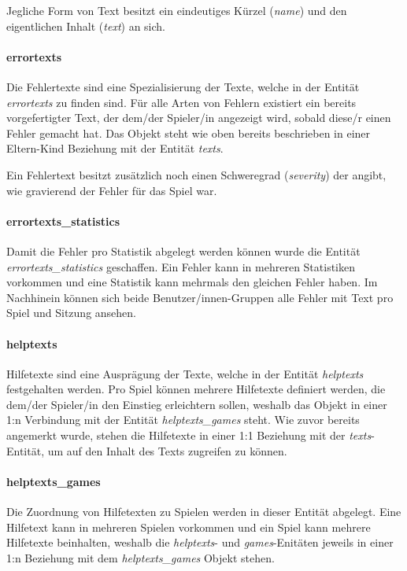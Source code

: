 Jegliche Form von Text besitzt ein eindeutiges Kürzel (\textit{name}) und den eigentlichen Inhalt (\textit{text}) an sich. 
    
\paragraph{errortexts}
Die Fehlertexte sind eine Spezialisierung der Texte, welche in der Entität \textit{errortexts} zu finden sind. Für alle Arten von Fehlern existiert ein bereits vorgefertigter Text, der dem/der Spieler/in angezeigt wird, sobald diese/r einen Fehler gemacht hat. Das Objekt steht wie oben bereits beschrieben in einer Eltern-Kind Beziehung mit der Entität \textit{texts}.

Ein Fehlertext besitzt zusätzlich noch einen Schweregrad (\textit{severity}) der angibt, wie gravierend der Fehler für das Spiel war.
    
\paragraph{errortexts\_statistics}
Damit die Fehler pro Statistik abgelegt werden können wurde die Entität \textit{errortexts\_statistics} geschaffen. Ein Fehler kann in mehreren Statistiken vorkommen und eine Statistik kann mehrmals den gleichen Fehler haben. Im Nachhinein können sich beide Benutzer/innen-Gruppen alle Fehler mit Text pro Spiel und Sitzung ansehen.
    
\paragraph{helptexts}
Hilfetexte sind eine Ausprägung der Texte, welche in der Entität \textit{helptexts} festgehalten werden. Pro Spiel können mehrere Hilfetexte definiert werden, die dem/der Spieler/in den Einstieg erleichtern sollen, weshalb das Objekt in einer 1:n Verbindung mit der Entität \textit{helptexts\_games} steht. Wie zuvor bereits angemerkt wurde, stehen die Hilfetexte in einer 1:1 Beziehung mit der \textit{texts}-Entität, um auf den Inhalt des Texts zugreifen zu können.
    
\paragraph{helptexts\_games}
Die Zuordnung von Hilfetexten zu Spielen werden in dieser Entität abgelegt. Eine Hilfetext kann in mehreren Spielen vorkommen und ein Spiel kann mehrere Hilfetexte beinhalten, weshalb die \textit{helptexts}- und \textit{games}-Enitäten jeweils in einer 1:n Beziehung mit dem \textit{helptexts\_games} Objekt stehen.

